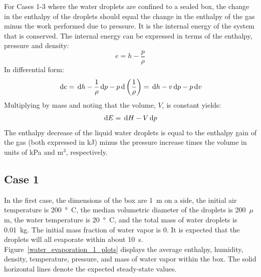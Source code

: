 \documentclass[11pt]{book}
\begin{document}
For Cases 1-3 where the water droplets are confined to a sealed box, the change in the enthalpy of the droplets should equal the change in the enthalpy of the gas minus the work
performed due to pressure. It is the internal energy of the system that is conserved. The internal energy can be expressed in terms of the
enthalpy, pressure and density:
\begin{equation} e = h - \frac{p}{\rho} \end{equation}
In differential form:
\begin{equation} \,\mathrm{d} e = \,\mathrm{d} h - \frac{1}{\rho} \,\mathrm{d} p - p \,\mathrm{d} \left(\frac{1}{\rho} \right) = \,\mathrm{d} h - v \,\mathrm{d} p - p \,\mathrm{d} v \end{equation}
Multiplying by mass and noting that the volume, $V$, is constant yields:
\begin{equation} \,\mathrm{d} E = \,\mathrm{d} H - V \,\mathrm{d} p \end{equation}
The enthalpy
decrease of the liquid water droplets is equal to the enthalpy gain of the gas (both expressed in kJ) minus the
pressure increase times the volume in
units of kPa and m$^3$, respectively.

\subsection{Case 1}
\label{water_evaporation_1}

In the first case, the dimensions of the box are 1~m on a side, the initial
air temperature is 200~\si{\degree C}, the median volumetric diameter of the droplets is 200~$\mu$m, the water temperature is 20~\si{\degree C}, and the total
mass of water droplets is 0.01~kg. The initial mass fraction of water vapor is 0.
It is expected that the droplets will all evaporate within about 10~s.
Figure~\ref{water_evaporation_1_plots} displays
the average enthalpy, humidity, density, temperature, pressure, and mass of water vapor within the box.
The solid horizontal lines denote the expected steady-state values.
\end{document}
